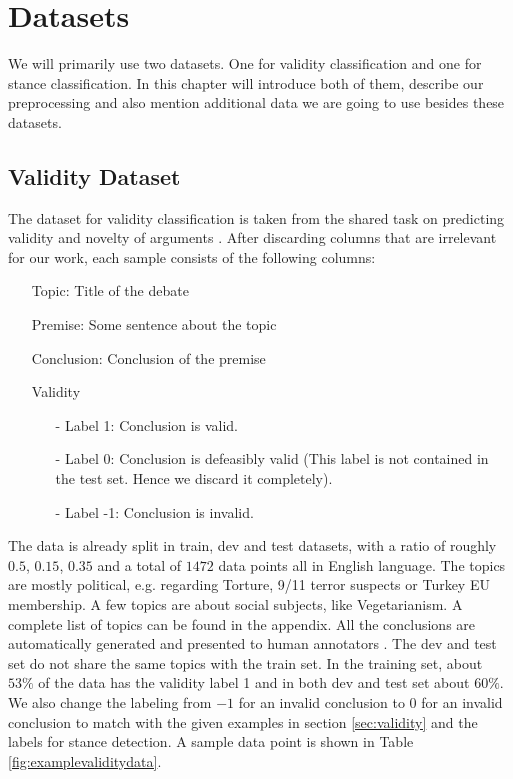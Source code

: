 \section{Datasets}

We will primarily use two datasets. One for validity classification and one for stance classification. In this chapter will introduce both of them, describe our preprocessing and also mention additional data we are going to use besides these datasets.

\subsection{Validity Dataset} \label{sec:validitydata}

The dataset for validity classification is taken from the shared task on predicting validity and novelty of arguments \cite{argsvalidnovel2022}. After discarding columns that are irrelevant for our work, each sample consists of the following columns:
\begin{enumerate}
	\item[\textbullet] Topic: Title of the debate
	\item[\textbullet] Premise: Some sentence about the topic
	\item[\textbullet] Conclusion: Conclusion of the premise
	\item[\textbullet] Validity
	\begin{enumerate}
		\item[-] Label 1: Conclusion is valid.
		\item[-] Label 0: Conclusion is defeasibly valid (This label is not contained in the test set. Hence we discard it completely).
		\item[-] Label -1: Conclusion is invalid.
	\end{enumerate}
\end{enumerate}
The data is already split in train, dev and test datasets, with a ratio of roughly $0.5$, $0.15$, $0.35$ and a total of $1472$ data points all in English language. The topics are mostly political, e.g. regarding Torture, 9/11 terror suspects or Turkey EU membership. A few topics are about social subjects, like Vegetarianism. A complete list of topics can be found in the appendix. All the conclusions are automatically generated and presented to human annotators \cite{argsvalidnovel2022}. The dev and test set do not share the same topics with the train set. In the training set, about $53\%$ of the data has the validity label 1 and in both dev and test set about $60\%$. We also change the labeling from $-1$ for an invalid conclusion to $0$ for an invalid conclusion to match with the given examples in section \ref{sec:validity} and the labels for stance detection. A sample data point is shown in Table \ref{fig:examplevaliditydata}.

